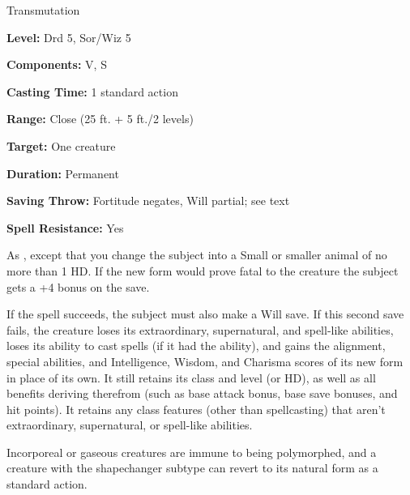 
Transmutation

\textbf{Level:} Drd 5, Sor/Wiz 5

\textbf{Components:} V, S

\textbf{Casting Time:} 1 standard action

\textbf{Range:} Close (25 ft. + 5 ft./2 levels)

\textbf{Target:} One creature

\textbf{Duration:} Permanent

\textbf{Saving Throw:} Fortitude negates, Will partial; see text

\textbf{Spell Resistance:} Yes

As , except that you change the subject into a Small or smaller 
animal of no more than 1 HD. If the new form would prove fatal to the creature 
the subject gets a +4 bonus on the save.

If the spell succeeds, the subject must also make a Will save. If this second save 
fails, the creature loses its extraordinary, supernatural, and spell-like abilities, 
loses its ability to cast spells (if it had the ability), and gains the alignment, 
special abilities, and Intelligence, Wisdom, and Charisma scores of its new form 
in place of its own. It still retains its class and level (or HD), as well as all 
benefits deriving therefrom (such as base attack bonus, base save bonuses, and 
hit points). It retains any class features (other than spellcasting) that aren't 
extraordinary, supernatural, or spell-like abilities.

Incorporeal or gaseous creatures are immune to being polymorphed, and 
a creature with the shapechanger subtype can revert to its natural form as a standard 
action.

